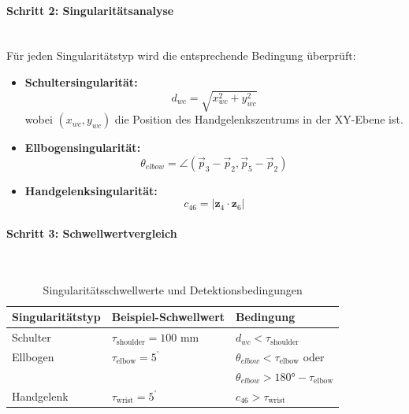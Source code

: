 \paragraph{Schritt 2: Singularitätsanalyse}~\\
Für jeden Singularitätstyp wird die entsprechende Bedingung überprüft:
\begin{itemize}
	\item \textbf{Schultersingularität:}
	      \begin{equation}
		      d_{wc} = \sqrt{x_{wc}^2 + y_{wc}^2}
	      \end{equation}
	      wobei $(x_{wc}, y_{wc})$ die Position des Handgelenkszentrums in der XY-Ebene ist.

	\item \textbf{Ellbogensingularität:}
	      \begin{equation}
		      \theta_{elbow} = \angle(\vec{p}_3 - \vec{p}_2, \vec{p}_5 - \vec{p}_2)
	      \end{equation}

	\item \textbf{Handgelenksingularität:}
	      \begin{equation}
		      c_{46} = |\mathbf{z}_4 \cdot \mathbf{z}_6|
	      \end{equation}
\end{itemize}

\paragraph{Schritt 3: Schwellwertvergleich}~\\
\begin{table}[H]
	\centering
	\begin{tabular}{l l l}
		\hline
		\textbf{Singularitätstyp} & \textbf{Beispiel-Schwellwert}      & \textbf{Bedingung}                            \\
		\hline
		Schulter                  & $\tau_{\text{shoulder}} = 100$ mm  & $d_{wc} < \tau_{\text{shoulder}}$             \\
		Ellbogen                  & $\tau_{\text{elbow}} = 5^{^\circ}$ & $\theta_{elbow} < \tau_{\text{elbow}}$ oder   \\
		                          &                                    & $\theta_{elbow} > 180° - \tau_{\text{elbow}}$ \\
		Handgelenk                & $\tau_{\text{wrist}} = 5^{^\circ}$ & $c_{46} > \tau_{\text{wrist}}$                \\
		\hline
	\end{tabular}
	\caption{Singularitätsschwellwerte und Detektionsbedingungen}
	\label{tab:singularity_thresholds}
\end{table}

